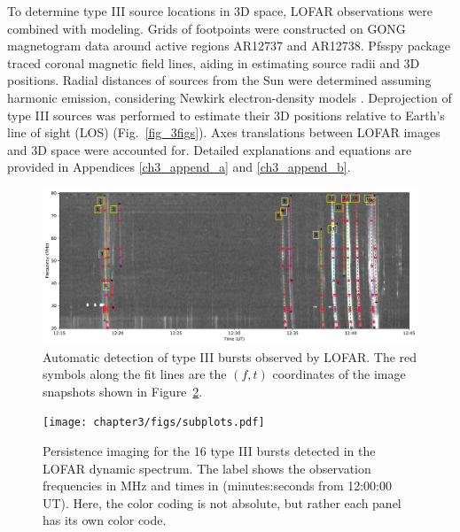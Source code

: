 To determine type III source locations in 3D space, LOFAR observations were combined with modeling. Grids of footpoints were constructed on GONG magnetogram data around active regions AR12737 and AR12738. Pfsspy package \citep{pfss_2020} traced coronal magnetic field lines, aiding in estimating source radii and 3D positions. Radial distances of sources from the Sun were determined assuming harmonic emission, considering Newkirk electron-density models \citep{newkirk_1961, newkirk_1967}. Deprojection of type III sources was performed to estimate their 3D positions relative to Earth's line of sight (LOS) (Fig.~\ref{fig_3figs}). Axes translations between LOFAR images and 3D space were accounted for. Detailed explanations and equations are provided in Appendices \ref{ch3_append_a} and \ref{ch3_append_b}.

\begin{figure}[!htp]
\centering
\includegraphics[width=\hsize]{chapter3/figs/lofar_dyspec_detect__snapshot_coords.pdf}
\caption{Automatic detection of type III bursts observed by LOFAR. The red symbols along the fit lines are the $(f,t)$ coordinates of the image snapshots shown in Figure~\ref{fig_persistence}.}
\label{lofar_burst_detect}
\end{figure}

\begin{figure}[!htp]
\centering
\texttt{[image: chapter3/figs/subplots.pdf]}
\caption{Persistence imaging for the 16 type III bursts detected in the LOFAR dynamic spectrum. The label shows the observation frequencies in MHz and times in (minutes:seconds from 12:00:00 UT). Here, the color coding is not absolute, but rather each panel has its own color code.}
\label{fig_persistence}
\end{figure}

